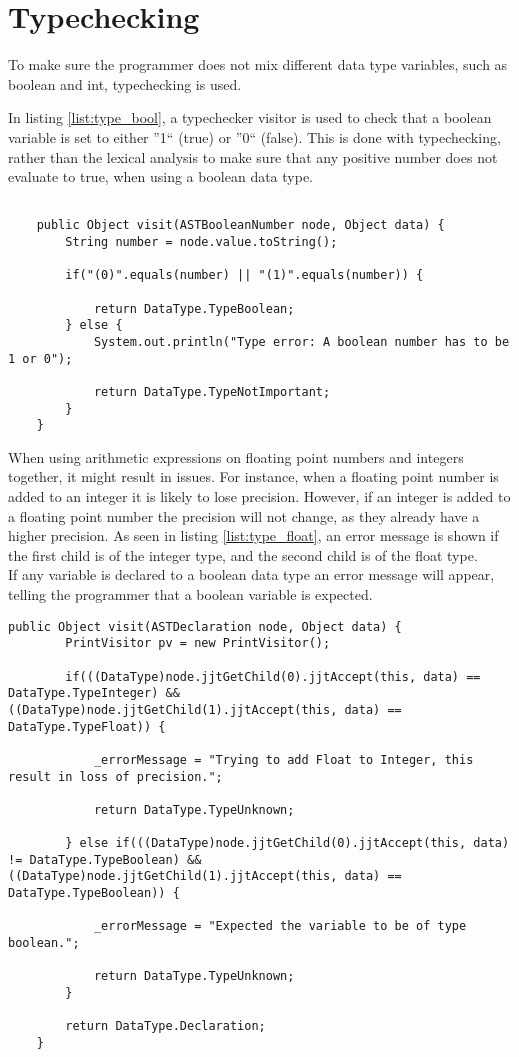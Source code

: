 \section{Typechecking}
To make sure the programmer does not mix different data type variables, such as boolean and int, typechecking is used.

In listing \ref{list:type_bool}, a typechecker visitor is used to check that a boolean variable is set to either ''1`` (true) or ''0`` (false). This is done with typechecking, rather than the lexical analysis to make sure that any positive number does not evaluate to true, when using a boolean data type.
\begin{lstlisting}[caption=Verifies/falsifies whether a boolean variable is 0 or 1, label=list:type_bool]

    public Object visit(ASTBooleanNumber node, Object data) {
    	String number = node.value.toString();

		if("(0)".equals(number) || "(1)".equals(number)) {
			
			return DataType.TypeBoolean;
		} else {
			System.out.println("Type error: A boolean number has to be 1 or 0");
			
			return DataType.TypeNotImportant;
		}	 
    }
\end{lstlisting}

When using arithmetic expressions on floating point numbers and integers together, it might result in issues. For instance, when a floating point number is added to an integer it is likely to lose precision. However, if an integer is added to a floating point number the precision will not change, as they already have a higher precision. As seen in listing \ref{list:type_float}, an error message is shown if the first child is of the integer type, and the second child is of the float type. \\
If any variable is declared to a boolean data type an error message will appear, telling the programmer that a boolean variable is expected.

\begin{lstlisting}[caption=Checks if float is being added to an integer\, and if a non-boolean type is set to a boolean value, label=list:type_float]
	public Object visit(ASTDeclaration node, Object data) {
		PrintVisitor pv = new PrintVisitor();

		if(((DataType)node.jjtGetChild(0).jjtAccept(this, data) == DataType.TypeInteger) && ((DataType)node.jjtGetChild(1).jjtAccept(this, data) == DataType.TypeFloat)) {

			_errorMessage = "Trying to add Float to Integer, this result in loss of precision.";

			return DataType.TypeUnknown;

		} else if(((DataType)node.jjtGetChild(0).jjtAccept(this, data) != DataType.TypeBoolean) && ((DataType)node.jjtGetChild(1).jjtAccept(this, data) == DataType.TypeBoolean)) {

			_errorMessage = "Expected the variable to be of type boolean.";

			return DataType.TypeUnknown;
		}

		return DataType.Declaration;
	}
\end{lstlisting}

